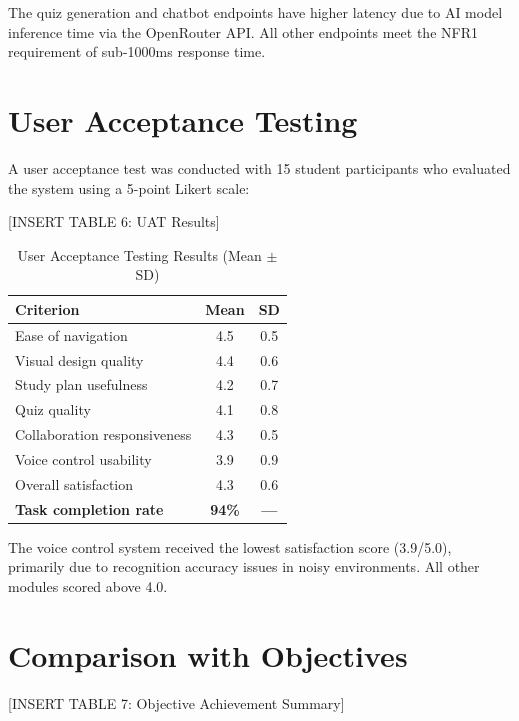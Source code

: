 \documentclass[12pt,a4paper]{report}
\begin{document}
The quiz generation and chatbot endpoints have higher latency due to AI model inference time via the OpenRouter API. All other endpoints meet the NFR1 requirement of sub-1000ms response time.

\section{User Acceptance Testing}

A user acceptance test was conducted with 15 student participants who evaluated the system using a 5-point Likert scale:

[INSERT TABLE 6: UAT Results]

\begin{table}[h]
\centering
\caption{User Acceptance Testing Results (Mean $\pm$ SD)}
\begin{tabular}{lcc}
\toprule
\textbf{Criterion} & \textbf{Mean} & \textbf{SD} \\
\midrule
Ease of navigation & 4.5 & 0.5 \\
Visual design quality & 4.4 & 0.6 \\
Study plan usefulness & 4.2 & 0.7 \\
Quiz quality & 4.1 & 0.8 \\
Collaboration responsiveness & 4.3 & 0.5 \\
Voice control usability & 3.9 & 0.9 \\
Overall satisfaction & 4.3 & 0.6 \\
\midrule
\textbf{Task completion rate} & \textbf{94\%} & \textbf{---} \\
\bottomrule
\end{tabular}
\label{tab:uat}
\end{table}

The voice control system received the lowest satisfaction score (3.9/5.0), primarily due to recognition accuracy issues in noisy environments. All other modules scored above 4.0.

\section{Comparison with Objectives}

[INSERT TABLE 7: Objective Achievement Summary]
\end{document}
